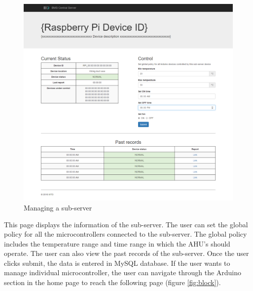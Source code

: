 \documentclass[letterpaper,11pt]{report}
\begin{document}
\newpage
\begin{figure}[h]
\includegraphics[width=\textwidth]{raspberrypi}
\centering
\captionsetup{justification=centering}
\caption{Managing a sub-server}
\label{fig:raspberrypi}
\end{figure}
This page displays the information of the sub-server. The user can set the global policy for all the microcontrollers connected to the sub-server. The global policy includes the temperature range and time range in which the AHU’s should operate. The user can also view the past records of the sub-server. Once the user clicks submit, the data is entered in MySQL database. If the user wants to manage individual microcontroller, the user can navigate through the Arduino section in the home page to reach the following page (figure \ref{fig:block}).
\end{document}
